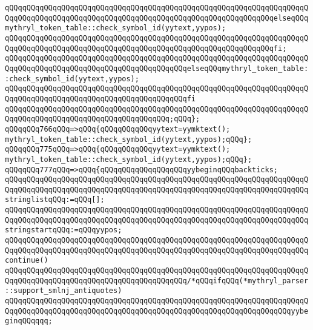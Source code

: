 \verb|qQQqqQQqqQQqqQQqqQQqqQQqqQQqqQQqqQQqqQQqqQQqqQQqqQQqqQQqqQQqqQQqqQQqqQQqqQQqqQQqqQQqqQQqqQQqqQQqqQQqqQQqqQQqqQQqqQQqqQQqqQQqqQQqqQQqelseqQQqmythryl_token_table::check_symbol_id(yytext,yypos);|\newline
\verb|qQQqqQQqqQQqqQQqqQQqqQQqqQQqqQQqqQQqqQQqqQQqqQQqqQQqqQQqqQQqqQQqqQQqqQQqqQQqqQQqqQQqqQQqqQQqqQQqqQQqqQQqqQQqqQQqqQQqqQQqqQQqqQQqqQQqfi;|\newline
\verb|qQQqqQQqqQQqqQQqqQQqqQQqqQQqqQQqqQQqqQQqqQQqqQQqqQQqqQQqqQQqqQQqqQQqqQQqqQQqqQQqqQQqqQQqqQQqqQQqqQQqqQQqqQQqqQQqelseqQQqmythryl_token_table::check_symbol_id(yytext,yypos);|\newline
\verb|qQQqqQQqqQQqqQQqqQQqqQQqqQQqqQQqqQQqqQQqqQQqqQQqqQQqqQQqqQQqqQQqqQQqqQQqqQQqqQQqqQQqqQQqqQQqqQQqqQQqqQQqqQQqqQQqfi|\newline
\verb|qQQqqQQqqQQqqQQqqQQqqQQqqQQqqQQqqQQqqQQqqQQqqQQqqQQqqQQqqQQqqQQqqQQqqQQqqQQqqQQqqQQqqQQqqQQqqQQqqQQqqQQqqQQq;qQQq};|\newline
\verb|qQQqqQQq766qQQq=>qQQq{qQQqqQQqqQQqyytext=yymktext();|\newline
\verb|mythryl_token_table::check_symbol_id(yytext,yypos);qQQq};|\newline
\verb|qQQqqQQq775qQQq=>qQQq{qQQqqQQqqQQqyytext=yymktext();|\newline
\verb|mythryl_token_table::check_symbol_id(yytext,yypos);qQQq};|\newline
\verb|qQQqqQQq777qQQq=>qQQq{qQQqqQQqqQQqqQQqqQQqyybeginqQQqbackticks;|\newline
\verb|qQQqqQQqqQQqqQQqqQQqqQQqqQQqqQQqqQQqqQQqqQQqqQQqqQQqqQQqqQQqqQQqqQQqqQQqqQQqqQQqqQQqqQQqqQQqqQQqqQQqqQQqqQQqqQQqqQQqqQQqqQQqqQQqqQQqqQQqqQQqstringlistqQQq:=qQQq[];|\newline
\verb|qQQqqQQqqQQqqQQqqQQqqQQqqQQqqQQqqQQqqQQqqQQqqQQqqQQqqQQqqQQqqQQqqQQqqQQqqQQqqQQqqQQqqQQqqQQqqQQqqQQqqQQqqQQqqQQqqQQqqQQqqQQqqQQqqQQqqQQqqQQqstringstartqQQq:=qQQqyypos;|\newline
\verb|qQQqqQQqqQQqqQQqqQQqqQQqqQQqqQQqqQQqqQQqqQQqqQQqqQQqqQQqqQQqqQQqqQQqqQQqqQQqqQQqqQQqqQQqqQQqqQQqqQQqqQQqqQQqqQQqqQQqqQQqqQQqqQQqqQQqqQQqqQQqcontinue()|\newline
\verb|qQQqqQQqqQQqqQQqqQQqqQQqqQQqqQQqqQQqqQQqqQQqqQQqqQQqqQQqqQQqqQQqqQQqqQQqqQQqqQQqqQQqqQQqqQQqqQQqqQQqqQQqqQQqqQQq/*qQQqifqQQq(*mythryl_parser::support_smlnj_antiquotes)|\newline
\verb|qQQqqQQqqQQqqQQqqQQqqQQqqQQqqQQqqQQqqQQqqQQqqQQqqQQqqQQqqQQqqQQqqQQqqQQqqQQqqQQqqQQqqQQqqQQqqQQqqQQqqQQqqQQqqQQqqQQqqQQqqQQqqQQqqQQqqQQqyybeginqQQqqqq;|\newline
